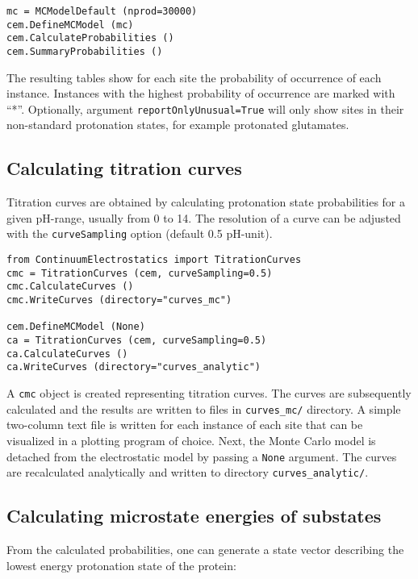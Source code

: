 \documentclass[12pt]{article}
\begin{document}
{{\footnotesize \singlespacing \begin{lstlisting}
mc = MCModelDefault (nprod=30000)
cem.DefineMCModel (mc)
cem.CalculateProbabilities ()
cem.SummaryProbabilities ()
\end{lstlisting} }

\bigskip
The resulting tables show for each site the probability of occurrence of each instance.
%
Instances with the highest probability of occurrence are marked with ``*''.
%
Optionally, argument {\tt reportOnlyUnusual=True} will only show sites
in their non-standard  protonation states, for example protonated glutamates.


\subsection{Calculating titration curves}
Titration curves are obtained by calculating protonation state probabilities
for a given pH-range,
usually from 0 to 14.
%
The resolution of a curve can be adjusted with
the {\tt curveSampling} option (default 0.5 pH-unit).

{\footnotesize \singlespacing \begin{lstlisting}
from ContinuumElectrostatics import TitrationCurves
cmc = TitrationCurves (cem, curveSampling=0.5)
cmc.CalculateCurves ()
cmc.WriteCurves (directory="curves_mc")

cem.DefineMCModel (None)
ca = TitrationCurves (cem, curveSampling=0.5)
ca.CalculateCurves ()
ca.WriteCurves (directory="curves_analytic")
\end{lstlisting} }

\bigskip

A {\tt cmc} object is created representing titration curves.
%
The curves are subsequently calculated and the results are written to files
in {\tt curves\_mc/} directory.
%
A simple two-column text file is written for each instance of each site that
can be visualized in a plotting program of choice.
%
Next,
the Monte Carlo model is detached from the electrostatic model by passing
a {\tt None} argument.
%
The curves are recalculated analytically and written to directory
{\tt curves\_analytic/}.


\subsection{Calculating microstate energies of substates}
From the calculated probabilities,
one can generate a state vector describing
the lowest energy protonation state of the protein:

}
\end{document}
